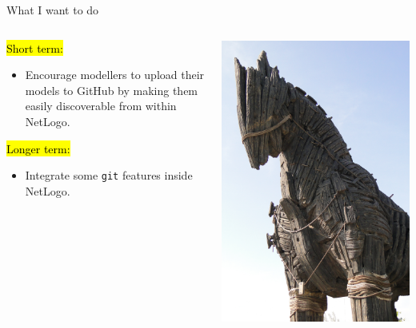 \documentclass{beamer}
\newcommand\st[1]{\hl{\larger #1}\par}
\begin{document}
\begin{frame}{What I want to do}

  \begin{columns}
    \begin{column}{0.5\textwidth}\Large
      \st{Short term:}
      \begin{itemize}
        \item Encourage modellers to upload their models to GitHub by making them easily discoverable from within NetLogo.
      \end{itemize}
      \st{Longer term:}
      \begin{itemize}
        \item Integrate some \texttt{git} features inside NetLogo.
      \end{itemize}
    \end{column}
    \begin{column}{0.5\textwidth}
      \begin{center}
        \includegraphics[height=0.7\textheight]{trojan}


\end{center}
\end{column}
\end{columns}
\end{frame}
\end{document}
